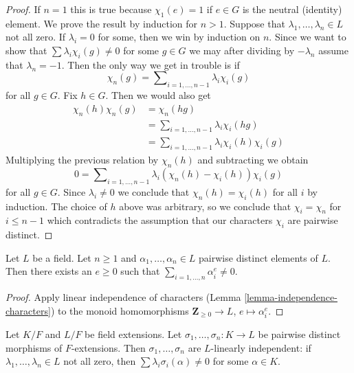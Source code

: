 \begin{proof}
If $n = 1$ this is true because $\chi_1(e) = 1$ if $e \in G$ is the
neutral (identity) element. We prove the result by induction for $n > 1$.
Suppose that $\lambda_1, \ldots, \lambda_n \in L$ not all zero.
If $\lambda_i = 0$ for some, then we win by induction on $n$.
Since we want to show that $\sum \lambda_i\chi_i(g) \not = 0$
for some $g \in G$ we may after dividing by $-\lambda_n$
assume that $\lambda_n = -1$. Then the only way we get in trouble
is if
$$
\chi_n(g) = \sum\nolimits_{i = 1, \ldots, n - 1} \lambda_i\chi_i(g)
$$
for all $g \in G$. Fix $h \in G$. Then we would also get
\begin{align*}
\chi_n(h)\chi_n(g) & = \chi_n(hg) \\
& = \sum\nolimits_{i = 1, \ldots, n - 1} \lambda_i\chi_i(hg) \\
& = \sum\nolimits_{i = 1, \ldots, n - 1} \lambda_i\chi_i(h) \chi_i(g)
\end{align*}
Multiplying the previous relation by $\chi_n(h)$ and subtracting we obtain
$$
0 = \sum\nolimits_{i = 1, \ldots, n - 1}
\lambda_i (\chi_n(h) - \chi_i(h)) \chi_i(g)
$$
for all $g \in G$. Since $\lambda_i \not = 0$ we conclude that
$\chi_n(h) = \chi_i(h)$ for all $i$ by induction.
The choice of $h$ above was arbitrary, so we conclude
that $\chi_i = \chi_n$ for $i \leq n - 1$ which contradicts
the assumption that our characters $\chi_i$ are pairwise distinct.
\end{proof}

\begin{lemma}
\label{lemma-sums-of-powers}
Let $L$ be a field. Let $n \geq 1$ and $\alpha_1, \ldots, \alpha_n \in L$
pairwise distinct elements of $L$. Then there exists an
$e \geq 0$ such that $\sum_{i = 1, \ldots, n} \alpha_i^e \not = 0$.
\end{lemma}

\begin{proof}
Apply linear independence of characters
(Lemma \ref{lemma-independence-characters})
to the monoid homomorphisms $\mathbf{Z}_{\geq 0} \to L$,
$e \mapsto \alpha_i^e$.
\end{proof}

\begin{lemma}
\label{lemma-independence-embeddings}
Let $K/F$ and $L/F$ be field extensions. Let
$\sigma_1, \ldots, \sigma_n : K \to L$ be pairwise distinct
morphisms of $F$-extensions. Then $\sigma_1, \ldots, \sigma_n$
are $L$-linearly independent: if $\lambda_1, \ldots, \lambda_n \in L$
not all zero, then $\sum \lambda_i\sigma_i(\alpha) \not = 0$
for some $\alpha \in K$.
\end{lemma}

